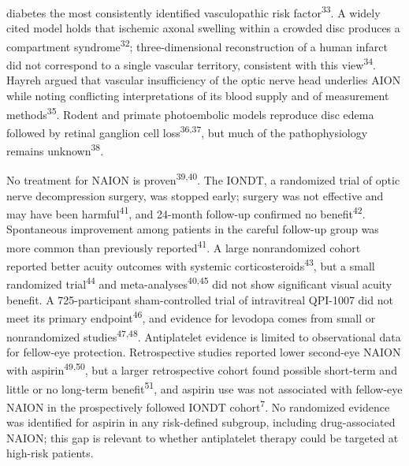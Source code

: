 \documentclass[
  11pt,
]{article}
\begin{document}
diabetes the most consistently identified vasculopathic risk
factor\textsuperscript{33}. A widely cited model holds that ischemic
axonal swelling within a crowded disc produces a compartment
syndrome\textsuperscript{32}; three-dimensional reconstruction of a
human infarct did not correspond to a single vascular territory,
consistent with this view\textsuperscript{34}. Hayreh argued that
vascular insufficiency of the optic nerve head underlies AION while
noting conflicting interpretations of its blood supply and of
measurement methods\textsuperscript{35}. Rodent and primate photoembolic
models reproduce disc edema followed by retinal ganglion cell
loss\textsuperscript{36,37}, but much of the pathophysiology remains
unknown\textsuperscript{38}.

No treatment for NAION is proven\textsuperscript{39,40}. The IONDT, a
randomized trial of optic nerve decompression surgery, was stopped
early; surgery was not effective and may have been
harmful\textsuperscript{41}, and 24-month follow-up confirmed no
benefit\textsuperscript{42}. Spontaneous improvement among patients in
the careful follow-up group was more common than previously
reported\textsuperscript{41}. A large nonrandomized cohort reported
better acuity outcomes with systemic
corticosteroids\textsuperscript{43}, but a small randomized
trial\textsuperscript{44} and meta-analyses\textsuperscript{40,45} did
not show significant visual acuity benefit. A 725-participant
sham-controlled trial of intravitreal QPI-1007 did not meet its primary
endpoint\textsuperscript{46}, and evidence for levodopa comes from small
or nonrandomized studies\textsuperscript{47,48}. Antiplatelet evidence
is limited to observational data for fellow-eye protection.
Retrospective studies reported lower second-eye NAION with
aspirin\textsuperscript{49,50}, but a larger retrospective cohort found
possible short-term and little or no long-term
benefit\textsuperscript{51}, and aspirin use was not associated with
fellow-eye NAION in the prospectively followed IONDT
cohort\textsuperscript{7}. No randomized evidence was identified for
aspirin in any risk-defined subgroup, including drug-associated NAION;
this gap is relevant to whether antiplatelet therapy could be targeted
at high-risk patients.
\end{document}
